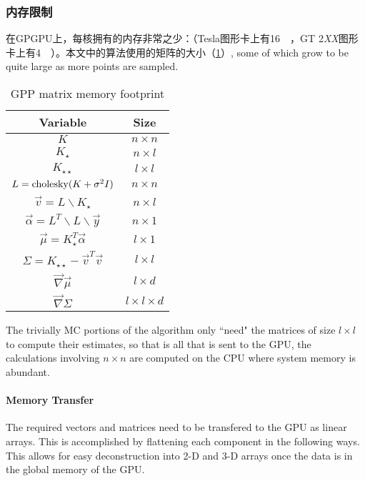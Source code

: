 \documentclass[index]{subfiles}
\begin{document}
\subsubsection{内存限制} %
\label{sub:Memory Restrictions}

在GPGPU上，每核拥有的内存非常之少：（Tesla图形卡上有\SI{16}{\kilo\byte}，GT 2{\it XX}图形卡上有\SI{4}{\kilo\byte}）。本文中的算法使用的矩阵的大小（\cref{EPImemory}）, some of which grow to be quite large as more points are sampled.

\begin{table}
    \caption{GPP matrix memory footprint}
    \label{EPImemory}
\begin{center}
    \begin{tabular}{c|c}
    Variable & Size \\
    \hline
    $K$ & $n \times n$ \\
    $K_{\star }$ & $n \times l$ \\
    $K_{\star \star }$ & $l \times l$ \\
    $L = {\rm cholesky}(K + \sigma^{2}I) $ & $n \times n$ \\
    $\vec{v} = L \backslash K_{\star }$ & $n \times l$ \\
    $\vec{\alpha} = L^{T} \backslash L \backslash \vec{y}$ & $n \times 1$ \\
    $\vec{\mu} = K_{\star }^{T}\vec{\alpha}$ & $l \times 1$  \\
    $\Sigma = K_{\star \star} - \vec{v}^{T}\vec{v}$ & $l \times l$ \\
    $\vec{\nabla} \vec{\mu}$ & $l \times d$ \\
    $\vec{\nabla} \Sigma$ & $l \times l \times d$
    \end{tabular}
\end{center}
\end{table}

The trivially MC portions of the algorithm only ``need" the matrices of size $l \times l$ to compute their estimates, so that is all that is sent to the GPU, the calculations involving $n \times n$ are computed on the CPU where system memory is abundant.

\paragraph{Memory Transfer} %
\label{ssub:Memory Transfer}

The required vectors and matrices need to be transfered to the GPU as linear arrays. This is accomplished by flattening each component in the following ways. This allows for easy deconstruction into 2-D and 3-D arrays once the data is in the global memory of the GPU.
\end{document}
